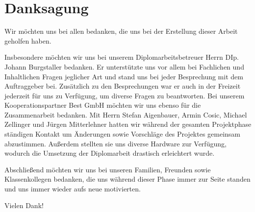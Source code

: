 \chapter*{Danksagung} 

Wir möchten uns bei allen bedanken, die uns bei der Erstellung dieser Arbeit geholfen haben.

Insbesondere möchten wir uns bei unserem Diplomarbeitsbetreuer Herrn DIp. Johann Burgstaller bedanken. Er unterstützte uns vor allem bei Fachlichen und Inhaltlichen Fragen jeglicher Art und stand uns bei jeder Besprechung mit dem Auftraggeber bei. Zusätzlich zu den Besprechungen war er auch in der Freizeit jederzeit für uns zu Verfügung, um diverse Fragen zu beantworten.
Bei unserem Kooperationspartner Best GmbH möchten wir uns ebenso für die Zusammenarbeit bedanken. Mit Herrn Stefan Aigenbauer, Armin Cosic, Michael Zellinger und Jürgen Mitterlehner hatten wir während der gesamten Projektphase ständigen Kontakt um Änderungen sowie Vorschläge des Projektes gemeinsam abzustimmen. Außerdem stellten sie uns diverse Hardware zur Verfügung, wodurch die Umsetzung der Diplomarbeit drastisch erleichtert wurde.

Abschließend möchten wir uns bei unseren Familien, Freunden sowie Klassenkollegen bedanken, die uns während dieser Phase immer zur Seite standen und uns immer wieder aufs neue motivierten.

Vielen Dank!


